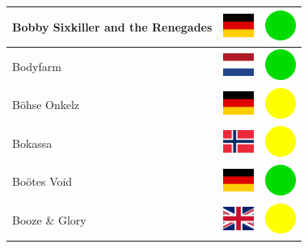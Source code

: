 \documentclass[12pt, a4paper, twoside]{report}
\begin{document}
\begin{center}
\begin{longtable}{|p{5cm}|p{2cm}|p{2cm}|}
 Bobby Sixkiller and the Renegades                          & \includegraphics[width=1cm]{../4x3/de} &   \includegraphics[width=1cm]{../likes/y} \\ \hline
 Bodyfarm                                                   & \includegraphics[width=1cm]{../4x3/nl} &   \includegraphics[width=1cm]{../likes/y} \\ \hline
 Böhse Onkelz                                               & \includegraphics[width=1cm]{../4x3/de} &   \includegraphics[width=1cm]{../likes/m} \\ \hline
 Bokassa                                                    & \includegraphics[width=1cm]{../4x3/no} &   \includegraphics[width=1cm]{../likes/m} \\ \hline
 Boötes Void                                                & \includegraphics[width=1cm]{../4x3/de} &   \includegraphics[width=1cm]{../likes/y} \\ \hline
 Booze \& Glory                                             & \includegraphics[width=1cm]{../4x3/gb} &   \includegraphics[width=1cm]{../likes/m} \\ \hline

\end{longtable}
\end{center}
\end{document}
